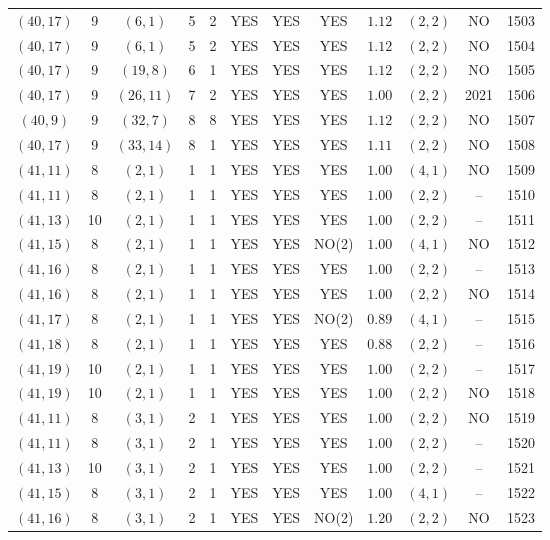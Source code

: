 \begin{longtable}{|c|c|c|c|c|c|c|c|c|c|c|c|}
$(40,17)$ & 9 & $(6,1)$ & 5 & 2 & YES & YES & YES & $1.12$ & $(2,2)$ & NO & 1503\\
$(40,17)$ & 9 & $(6,1)$ & 5 & 2 & YES & YES & YES & $1.12$ & $(2,2)$ & NO & 1504\\
$(40,17)$ & 9 & $(19,8)$ & 6 & 1 & YES & YES & YES & $1.12$ & $(2,2)$ & NO & 1505\\
$(40,17)$ & 9 & $(26,11)$ & 7 & 2 & YES & YES & YES & $1.00$ & $(2,2)$ & 2021 & 1506\\
$(40,9)$ & 9 & $(32,7)$ & 8 & 8 & YES & YES & YES & $1.12$ & $(2,2)$ & NO & 1507\\
$(40,17)$ & 9 & $(33,14)$ & 8 & 1 & YES & YES & YES & $1.11$ & $(2,2)$ & NO & 1508\\
$(41,11)$ & 8 & $(2,1)$ & 1 & 1 & YES & YES & YES & $1.00$ & $(4,1)$ & NO & 1509\\
$(41,11)$ & 8 & $(2,1)$ & 1 & 1 & YES & YES & YES & $1.00$ & $(2,2)$ & -- & 1510\\
$(41,13)$ & 10 & $(2,1)$ & 1 & 1 & YES & YES & YES & $1.00$ & $(2,2)$ & -- & 1511\\
$(41,15)$ & 8 & $(2,1)$ & 1 & 1 & YES & YES & NO(2) & $1.00$ & $(4,1)$ & NO & 1512\\
$(41,16)$ & 8 & $(2,1)$ & 1 & 1 & YES & YES & YES & $1.00$ & $(2,2)$ & -- & 1513\\
$(41,16)$ & 8 & $(2,1)$ & 1 & 1 & YES & YES & YES & $1.00$ & $(2,2)$ & NO & 1514\\
$(41,17)$ & 8 & $(2,1)$ & 1 & 1 & YES & YES & NO(2) & $0.89$ & $(4,1)$ & -- & 1515\\
$(41,18)$ & 8 & $(2,1)$ & 1 & 1 & YES & YES & YES & $0.88$ & $(2,2)$ & -- & 1516\\
$(41,19)$ & 10 & $(2,1)$ & 1 & 1 & YES & YES & YES & $1.00$ & $(2,2)$ & -- & 1517\\
$(41,19)$ & 10 & $(2,1)$ & 1 & 1 & YES & YES & YES & $1.00$ & $(2,2)$ & NO & 1518\\
$(41,11)$ & 8 & $(3,1)$ & 2 & 1 & YES & YES & YES & $1.00$ & $(2,2)$ & NO & 1519\\
$(41,11)$ & 8 & $(3,1)$ & 2 & 1 & YES & YES & YES & $1.00$ & $(2,2)$ & -- & 1520\\
$(41,13)$ & 10 & $(3,1)$ & 2 & 1 & YES & YES & YES & $1.00$ & $(2,2)$ & -- & 1521\\
$(41,15)$ & 8 & $(3,1)$ & 2 & 1 & YES & YES & YES & $1.00$ & $(4,1)$ & -- & 1522\\
$(41,16)$ & 8 & $(3,1)$ & 2 & 1 & YES & YES & NO(2) & $1.20$ & $(2,2)$ & NO & 1523\\

\end{longtable}
